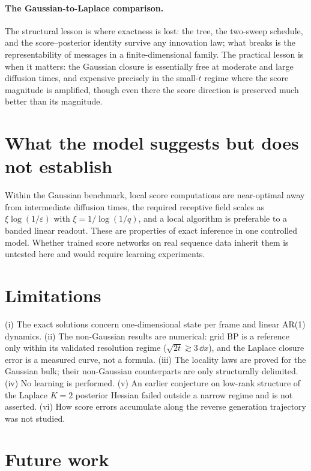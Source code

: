 \paragraph{The Gaussian-to-Laplace comparison.} The structural lesson is
where exactness is lost: the tree, the two-sweep schedule, and the
score--posterior identity survive any innovation law; what breaks is the
representability of messages in a finite-dimensional family. The
practical lesson is when it matters: the Gaussian closure is essentially
free at moderate and large diffusion times, and expensive precisely in
the small-$t$ regime where the score magnitude is amplified, though even
there the score direction is preserved much better than its magnitude.

\section{What the model suggests but does not establish}

Within the Gaussian benchmark, local score computations are near-optimal
away from intermediate diffusion times, the required receptive field
scales as $\xi \log(1/\varepsilon)$ with $\xi = 1/\log(1/q)$, and a
local algorithm is preferable to a banded linear readout. These are
properties of exact inference in one controlled model. Whether trained
score networks on real sequence data inherit them is untested here and
would require learning experiments.

\section{Limitations}

(i) The exact solutions concern one-dimensional state per frame and
linear AR(1) dynamics. (ii) The non-Gaussian results are numerical: grid
BP is a reference only within its validated resolution regime
($\sqrt{2t} \gtrsim 3\,\dd x$), and the Laplace closure error is a
measured curve, not a formula. (iii) The locality laws are proved for
the Gaussian bulk; their non-Gaussian counterparts are only structurally
delimited. (iv) No learning is performed. (v) An earlier conjecture on
low-rank structure of the Laplace $K = 2$ posterior Hessian failed
outside a narrow regime and is not asserted. (vi) How score errors
accumulate along the reverse generation trajectory was not studied.

\section{Future work}

